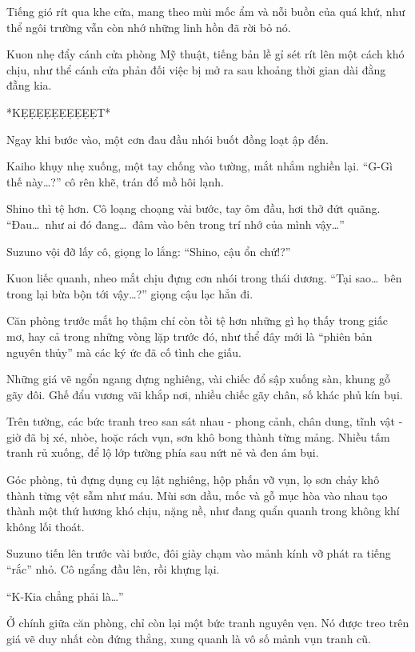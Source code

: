 \documentclass[../main.tex]{subfiles}
\begin{document}
Tiếng gió rít qua khe cửa, mang theo mùi mốc ẩm và nỗi buồn của quá khứ, như thể ngôi trường vẫn còn nhớ những linh hồn đã rời bỏ nó.

Kuon nhẹ đẩy cánh cửa phòng Mỹ thuật, tiếng bản lề gỉ sét rít lên một cách khó chịu, như thể cánh cửa phản đối việc bị mở ra sau khoảng thời gian dài đằng đẵng kia.

*KẸẸẸẸẸẸẸẸẸẸT*

Ngay khi bước vào, một cơn đau đầu nhói buốt đồng loạt ập đến.

Kaiho khụy nhẹ xuống, một tay chống vào tường, mắt nhắm nghiền lại. ``G-Gì thế này\dots?'' cô rên khẽ, trán đổ mồ hôi lạnh.

Shino thì tệ hơn. Cô loạng choạng vài bước, tay ôm đầu, hơi thở đứt quãng. ``Đau\dots\ như ai đó đang\dots\ đâm vào bên trong trí nhớ của mình vậy\dots''

Suzuno vội đỡ lấy cô, giọng lo lắng: ``Shino, cậu ổn chứ!?''

Kuon liếc quanh, nheo mắt chịu đựng cơn nhói trong thái dương.
``Tại sao\dots\ bên trong lại bừa bộn tới vậy\dots?'' giọng cậu lạc hẳn đi.

Căn phòng trước mắt họ thậm chí còn tồi tệ hơn những gì họ thấy trong giấc mơ, hay cả trong những vòng lặp trước đó, như thể đây mới là ``phiên bản nguyên thủy'' mà các ký ức đã cố tình che giấu.

Những giá vẽ ngổn ngang dựng nghiêng, vài chiếc đổ sập xuống sàn, khung gỗ gãy đôi. Ghế đẩu vương vãi khắp nơi, nhiều chiếc gãy chân, số khác phủ kín bụi.

Trên tường, các bức tranh treo san sát nhau -  phong cảnh, chân dung, tĩnh vật - giờ đã bị xé, nhòe, hoặc rách vụn, sơn khô bong thành từng mảng. Nhiều tấm tranh rủ xuống, để lộ lớp tường phía sau nứt nẻ và đen ám bụi.

Góc phòng, tủ đựng dụng cụ lật nghiêng, hộp phấn vỡ vụn, lọ sơn chảy khô thành từng vệt sẫm như máu.
Mùi sơn dầu, mốc và gỗ mục hòa vào nhau tạo thành một thứ hương khó chịu, nặng nề, như đang quẩn quanh trong không khí không lối thoát.


Suzuno tiến lên trước vài bước, đôi giày chạm vào mảnh kính vỡ phát ra tiếng ``rắc'' nhỏ. Cô ngẩng đầu lên, rồi khựng lại.

``K-Kia chẳng phải là\dots''

Ở chính giữa căn phòng, chỉ còn lại một bức tranh nguyên vẹn. Nó được treo trên giá vẽ duy nhất còn đứng thẳng, xung quanh là vô số mảnh vụn tranh cũ.
\end{document}
